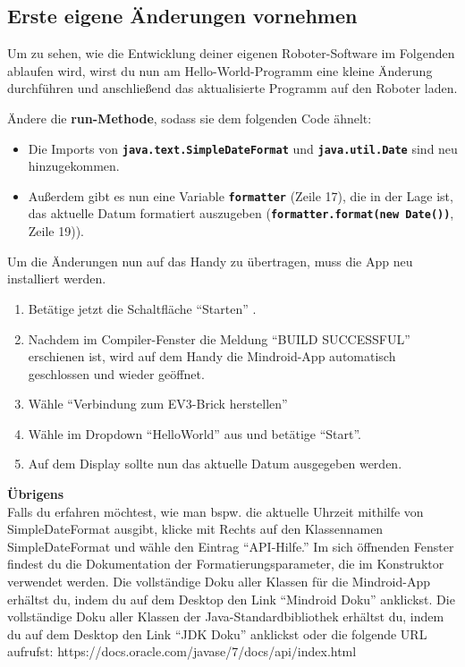 \documentclass[
	12pt,
	article,
	type=bsc, %
	colorbacktitle,
	instlogo,
	accentcolor=tud1c,
	german,
	twoside
]{tudexercise}
\newcommand{\solpath}[0]{../../impl/androidApp/app/src/main/java/org/mindroid/android/app/workshopSolutions}
\newcommand{\bfcode}[1]{\texttt{\textbf{#1}}}
\begin{document}
	\subsection{Erste eigene Änderungen vornehmen}
	Um zu sehen, wie die Entwicklung deiner eigenen Roboter-Software im Folgenden ablaufen wird, wirst du nun am Hello-World-Programm eine kleine Änderung durchführen und anschließend das aktualisierte Programm auf den Roboter laden.

	Ändere die \textbf{run-Methode}, sodass sie dem folgenden Code ähnelt:
	
	
	\begin{itemize}
	\item Die Imports von \bfcode{java.text.SimpleDateFormat} und \bfcode{java.util.Date} sind neu hinzugekommen.
	\item Außerdem gibt es nun eine Variable \bfcode{formatter} (Zeile 17), die in der Lage ist, das aktuelle Datum formatiert auszugeben (\bfcode{formatter.format(new Date())}, Zeile 19)).
	\end{itemize}
	Um die Änderungen nun auf das Handy zu übertragen, muss die App neu installiert werden.
	\begin{enumerate}
	\item Betätige jetzt die Schaltfläche “Starten” .
	\item Nachdem im Compiler-Fenster die Meldung “BUILD SUCCESSFUL” erschienen ist, wird auf dem Handy die Mindroid-App automatisch geschlossen und wieder geöffnet.
	\item Wähle “Verbindung zum EV3-Brick herstellen”
	\item Wähle im Dropdown “HelloWorld” aus und betätige “Start”.
	\item Auf dem Display sollte nun das aktuelle Datum ausgegeben werden.
	
	\end{enumerate}
	
\textbf{Übrigens}\\
	
Falls du erfahren möchtest, wie man bspw. die aktuelle Uhrzeit mithilfe von SimpleDateFormat ausgibt, klicke mit Rechts auf den Klassennamen SimpleDateFormat und wähle den Eintrag “API-Hilfe.” Im sich öffnenden Fenster findest du die Dokumentation der Formatierungsparameter, die im Konstruktor verwendet werden.
Die vollständige Doku aller Klassen für die Mindroid-App erhältst du, indem du auf dem Desktop den Link “Mindroid Doku” anklickst.
Die vollständige Doku aller Klassen der Java-Standardbibliothek erhältst du, indem du auf dem Desktop den Link “JDK Doku” anklickst oder die folgende URL aufrufst: https://docs.oracle.com/javase/7/docs/api/index.html 
\end{document}
